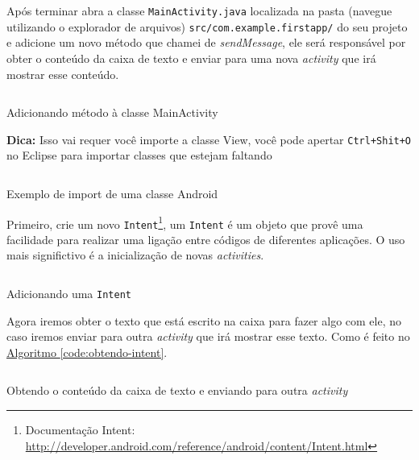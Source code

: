 \documentclass[a4paper,12pt,brazil,oneside]{book}
\begin{document}
\begin{singlespace}
Após terminar abra a classe \texttt{MainActivity.java} localizada na pasta (navegue utilizando o explorador de arquivos)
\texttt{src/com.example.firstapp/} do seu projeto e adicione um novo método que chamei de \emph{sendMessage}, ele será responsável por obter o conteúdo da caixa de texto e enviar para uma nova \emph{activity} que irá mostrar esse conteúdo.

\begin{listing}
\inputminted[linenos=true,fontsize=\small,frame=lines, framesep=2mm, tabsize=2,numbersep=5pt]{java}{src/firstapp/4.java}
\caption{Adicionando método à classe MainActivity}
\end{listing}

\begin{framed}
\textbf{Dica:} Isso vai requer você importe a classe View, você pode apertar \texttt{Ctrl+Shit+O} no Eclipse para importar classes que estejam faltando
\end{framed}

\begin{listing}
\inputminted[linenos=true,fontsize=\small,frame=lines, framesep=2mm, tabsize=2,numbersep=5pt]{java}{src/firstapp/4-2.java}
\caption{Exemplo de import de uma classe Android}
\end{listing}

Primeiro, crie um novo \texttt{Intent}\footnote{Documentação Intent: \href{http://developer.android.com/reference/android/content/Intent.html}{http://developer.android.com/reference/android/content/Intent.html}}, um \texttt{Intent} é um objeto que provê uma facilidade para realizar uma ligação entre códigos de diferentes aplicações. O uso mais significtivo é a inicialização de novas \emph{activities}.

\begin{listing}[H]
\inputminted[linenos=true,fontsize=\small,frame=lines, framesep=2mm, tabsize=2,numbersep=5pt]{java}{src/firstapp/5.java}
\caption{Adicionando uma \texttt{Intent}}
\label{code:obtendo-intent}
\end{listing}

Agora iremos obter o texto que está escrito na caixa para fazer algo com ele, no caso iremos enviar para outra \emph{activity} que irá mostrar esse texto. Como é feito no \hyperref[code:obtendo-intent]{Algoritmo \ref*{code:obtendo-intent}}.

\begin{listing}[H]
\inputminted[linenos=true,fontsize=\small,frame=lines, framesep=2mm, tabsize=2,numbersep=5pt]{java}{src/firstapp/6.java}
\caption{Obtendo o conteúdo da caixa de texto e enviando para outra \emph{activity}}
\end{listing}


\end{singlespace}
\end{document}
